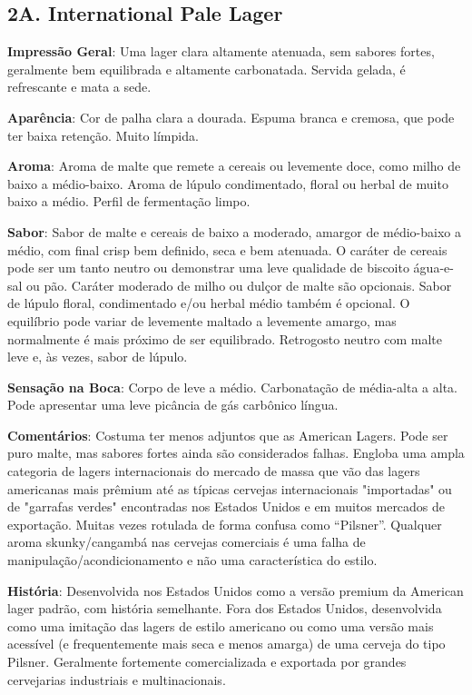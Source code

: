 \subsection*{2A. International Pale Lager}

\textbf{Impressão Geral}: Uma lager clara altamente atenuada, sem sabores fortes, geralmente bem equilibrada e altamente carbonatada. Servida gelada, é refrescante e mata a sede.

\textbf{Aparência}: Cor de palha clara a dourada. Espuma branca e cremosa, que pode ter baixa retenção. Muito límpida.

\textbf{Aroma}: Aroma de malte que remete a cereais ou levemente doce, como milho de baixo a médio-baixo. Aroma de lúpulo condimentado, floral ou herbal de muito baixo a médio. Perfil de fermentação limpo.

\textbf{Sabor}: Sabor de malte e cereais de baixo a moderado, amargor de médio-baixo a médio, com final crisp bem definido, seca e bem atenuada. O caráter de cereais pode ser um tanto neutro ou demonstrar uma leve qualidade de biscoito água-e-sal ou pão. Caráter moderado de milho ou dulçor de malte são opcionais. Sabor de lúpulo floral, condimentado e/ou herbal médio também é opcional. O equilíbrio pode variar de levemente maltado a levemente amargo, mas normalmente é mais próximo de ser equilibrado. Retrogosto neutro com malte leve e, às vezes, sabor de lúpulo.

\textbf{Sensação na Boca}: Corpo de leve a médio. Carbonatação de média-alta a alta. Pode apresentar uma leve picância de gás carbônico língua.

\textbf{Comentários}: Costuma ter menos adjuntos que as American Lagers. Pode ser puro malte, mas sabores fortes ainda são considerados falhas. Engloba uma ampla categoria de lagers internacionais do mercado de massa que vão das lagers americanas mais prêmium até as típicas cervejas internacionais "importadas" ou de "garrafas verdes" encontradas nos Estados Unidos e em muitos mercados de exportação. Muitas vezes rotulada de forma confusa como “Pilsner”. Qualquer aroma skunky/cangambá nas cervejas comerciais é uma falha de manipulação/acondicionamento e não uma característica do estilo.

\textbf{História}: Desenvolvida nos Estados Unidos como a versão premium da American lager padrão, com história semelhante. Fora dos Estados Unidos, desenvolvida como uma imitação das lagers de estilo americano ou como uma versão mais acessível (e frequentemente mais seca e menos amarga) de uma cerveja do tipo Pilsner. Geralmente fortemente comercializada e exportada por grandes cervejarias industriais e multinacionais.


